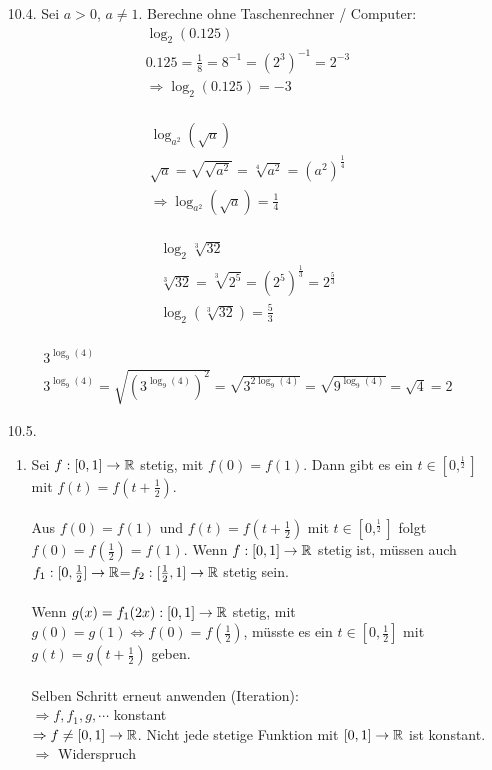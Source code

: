 \documentclass{HM}
\begin{document}
\begin{enumerate}
\newpage
\item [10.4.] Sei $a > 0$, $ a \neq 1$. Berechne ohne Taschenrechner / Computer:\\

\begin{align*}
	\log_2 (0.125)\\
	0.125=\frac{1}{8}=8^{-1}=(2^3)^{-1}=2^{-3}\\
	\Rightarrow \log_2 (0.125) = -3
\end{align*}\\
\begin{align*}
	\log_{a^2}(\sqrt{a})\\
	\sqrt{a}=\sqrt{\sqrt{a^2}}=\sqrt[4]{a^2}=(a^2)^\frac{1}{4}\\
	\Rightarrow \log_{a^2}(\sqrt{a}) = \frac{1}{4}
\end{align*}\\
\begin{align*}
	\log_2\sqrt[3]{32}\\
	\sqrt[3]{32}=\sqrt[3]{2^5}=(2^5)^\frac{1}{3}=2^\frac{5}{3}\\
	\log_2(\sqrt[3]{32}) = \frac{5}{3}	
\end{align*}\\
\begin{align*}
	3^{\log_9 (4)}\\
	3^{\log_9 (4)} = \sqrt{(3^{\log_9 (4)})^2} = \sqrt{3^{2\log_9 (4)}} = \sqrt{9^{\log_9 (4)}} = \sqrt{4} = 2
\end{align*}

\item [10.5.]
\begin{enumerate}
	\item Sei $f: [0,1] \to\mathbb{R}$ stetig, mit $f(0)=f(1)$. Dann gibt es ein $t\in[0,^\frac{1}{2}]$ mit $f(t)=f(t+\frac{1}{2})$.\\\\
	Aus $f(0)=f(1)$ und $f(t)=f(t+\frac{1}{2})$ mit $t\in[0,^\frac{1}{2}]$ folgt $f(0) = f(\frac{1}{2}) = f(1)$. Wenn $f:[0,1]\to\mathbb{R}$ stetig ist, müssen auch $f_1:[0,\frac{1}{2}]\to\mathbb{R}$=$f_2:[\frac{1}{2},1]\to\mathbb{R}$ stetig sein.\\\\
	Wenn $g(x)=f_1(2x):[0,1]\to\mathbb{R}$ stetig, mit $g(0)=g(1)\Leftrightarrow f(0)=f(\frac{1}{2})$, müsste es ein $t\in[0,\frac{1}{2}]$ mit $g(t)=g(t+\frac{1}{2})$ geben.\\\\
	Selben Schritt erneut anwenden (Iteration):\\
	$\Rightarrow f,f_1,g,\cdots$ konstant\\
	$\Rightarrow f\not=[0,1]\to\mathbb{R}$. Nicht jede stetige Funktion mit $[0,1]\to\mathbb{R}$ ist konstant.
	$\Rightarrow$ Widerspruch
	

\end{enumerate}
\end{enumerate}
\end{document}
